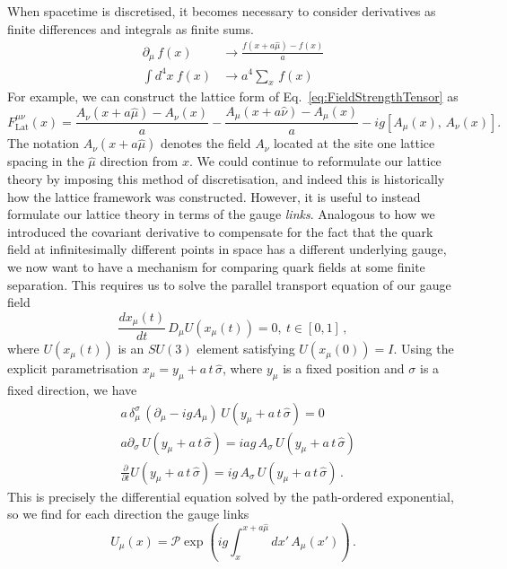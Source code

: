When spacetime is discretised, it becomes necessary to consider derivatives as finite differences and integrals as finite sums.
\begin{align*}
\partial_\mu\,f(x)&\rightarrow \frac{f(x+a\hat{\mu})-f(x)}{a}\\
\int d^4x~f(x) &\rightarrow a^4\sum_x \,f(x)
\end{align*}
For example, we can construct the lattice form of Eq.~\ref{eq:FieldStrengthTensor} as
%
\begin{equation}
F_{\text{Lat}}^{\mu\nu}(x) = \frac{A_\nu(x+a\hat{\mu})-A_\nu(x)}{a}-\frac{A_\mu(x+a\hat{\nu})-A_\mu(x)}{a}-ig[A_\mu(x),\,A_\nu(x)].
\label{eq:DiscreteFST}
\end{equation}
%
The notation $A_\nu(x+a\hat{\mu})$ denotes the field $A_\nu$ located at the site one lattice spacing in the $\hat{\mu}$ direction from $x$. We could continue to reformulate our lattice theory by imposing this method of discretisation, and indeed this is historically how the lattice framework was constructed\cite{Wilson:1974sk}. However, it is useful to instead formulate our lattice theory in terms of the gauge {\it links}. Analogous to how we introduced the covariant derivative to compensate for the fact that the quark field at infinitesimally different points in space has a different underlying gauge, we now want to have a mechanism for comparing quark fields at some finite separation. This requires us to solve the parallel transport equation of our gauge field~\cite{Bing:1999ee}
%
\begin{equation}
\frac{dx_\mu(t)}{dt}\,D_\mu U(x_\mu(t))=0,~t\in [0,1]\, ,
\end{equation}
%
where $U(x_\mu(t))$ is an $SU(3)$ element satisfying $U(x_\mu(0))=I$. Using the explicit parametrisation $x_\mu = y_\mu+a\,t\,\hat{\sigma}$, where $y_\mu$ is a fixed position and $\sigma$ is a fixed direction, we have
\begin{align*}
&a\,\delta^\sigma_\mu\, (\partial_\mu-igA_\mu)\,U(y_\mu+a\,t\,\hat{\sigma})=0\\
&a\partial_\sigma\, U(y_\mu+a\,t\,\hat{\sigma}) = iag\, A_\sigma\,U(y_\mu+a\,t\,\hat{\sigma})\\
&\frac{\partial}{\partial t}U(y_\mu+a\,t\,\hat{\sigma}) = ig\,A_\sigma\, U(y_\mu+a\,t\,\hat{\sigma})\, .
\end{align*}
This is precisely the differential equation solved by the path-ordered exponential, so we find for each direction the gauge links
\begin{equation}
U_\mu(x) = \mathcal{P}\exp\left(ig\int_x^{x+a\hat{\mu}}dx'\,A_\mu(x')\right)\, .
\label{eq:GaugeLink}
\end{equation}
